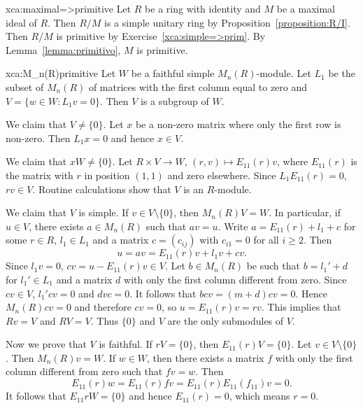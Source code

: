\begin{sol}{xca:maximal=>primitive}
	Let $R$ be a ring with identity and $M$ be a maximal ideal of $R$. Then 
	$R/M$ is a simple unitary ring by 
	Proposition~\ref{proposition:R/I}. Then $R/M$ is primitive by
	Exercise~\ref{xca:simple=>prim}. By Lemma~\ref{lemma:primitivo}, 
	$M$ is primitive. 
\end{sol}


    

\begin{sol}{xca:M_n(R)primitive}
    Let $W$ be a faithful simple $M_n(R)$-module. Let 
    $L_1$ be the subset of $M_n(R)$ of matrices 
    with the first column equal to zero and 
    $V=\{w\in W:L_1v=0\}$. Then $V$ is a subgroup of $W$. 

    We claim that $V\ne\{0\}$. Let $x$ be 
    a non-zero matrix where only the first row is non-zero. Then 
    $L_1x=0$ and hence $x\in V$. 

    We claim that $xW\ne\{0\}$. 
    Let $R\times V\to W$, $(r,v)\mapsto E_{11}(r)v$, where $E_{11}(r)$ is the matrix 
    with $r$ in position $(1,1)$ and zero elsewhere. Since 
    $L_1E_{11}(r)=0$, $rv\in V$. Routine calculations show
    that $V$ is an $R$-module. 
    
    We claim that $V$ is simple. 
    If $v\in V\setminus\{0\}$, then 
    $M_n(R)V=W$. In particular, if $u\in V$, 
    there exists $a\in M_n(R)$ 
    such that $av=u$. Write $a=E_{11}(r)+l_1+c$ for
    some $r\in R$, $l_1\in L_1$ and a matrix 
    $c=(c_{ij})$ with $c_{i1}=0$ for all $i\geq2$. Then
    \[
    u=av=E_{11}(r)v+l_1v+cv.
    \]
    Since $l_1v=0$, $cv=u-E_{11}(r)v\in V$. Let $b\in M_n(R)$ 
    be such that $b=l_1'+d$ for $l_1'\in L_1$ and a matrix $d$
    with only the first column different from zero. Since $cv\in V$, 
    $l_1'cv=0$ and $dvc=0$. It follows that
    $bcv=(m+d)cv=0$. Hence $M_n(R)cv=0$ and 
    therefore $cv=0$, so $u=E_{11}(r)v=rv$. This implies that 
    $Rv=V$ and $RV=V$. Thus $\{0\}$ and $V$ are the only 
    submodules of $V$. 

    Now we prove that $V$ is faithful. If $rV=\{0\}$, then
    $E_{11}(r)V=\{0\}$. Let $v\in V\setminus\{0\}$. Then
    $M_n(R)v=W$. If $w\in W$, then there exists 
    a matrix $f$ with only the first column different from zero
    such that $fv=w$. Then
    \[
    E_{11}(r)w=E_{11}(r)fv=E_{11}(r)E_{11}(f_{11})v=0.
    \]
    It follows that $E_{11}rW=\{0\}$ and
    hence $E_{11}(r)=0$, which means $r=0$.
\end{sol}

